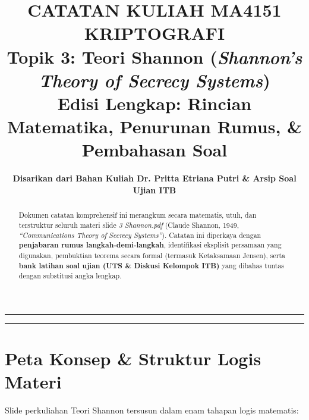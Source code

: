 \documentclass[11pt,a4paper]{article}
\title{\vspace{-1cm}\textbf{\Large CATATAN KULIAH MA4151 KRIPTOGRAFI}\\\large Topik 3: Teori Shannon (\textit{Shannon's Theory of Secrecy Systems})\\\large\textbf{Edisi Lengkap: Rincian Matematika, Penurunan Rumus, \& Pembahasan Soal}}
\author{\textbf{Disarikan dari Bahan Kuliah Dr. Pritta Etriana Putri \& Arsip Soal Ujian ITB}}
\date{}
\begin{document}
\maketitle
\vspace{-0.6cm}

\begin{abstract}
Dokumen catatan komprehensif ini merangkum secara matematis, utuh, dan terstruktur seluruh materi slide \textit{3 Shannon.pdf} (Claude Shannon, 1949, \textit{``Communications Theory of Secrecy Systems''}). Catatan ini diperkaya dengan \textbf{penjabaran rumus langkah-demi-langkah}, identifikasi eksplisit persamaan yang digunakan, pembuktian teorema secara formal (termasuk Ketaksamaan Jensen), serta \textbf{bank latihan soal ujian (UTS \& Diskusi Kelompok ITB)} yang dibahas tuntas dengan substitusi angka lengkap.
\end{abstract}

\vspace{0.2cm}
\hrule
\vspace{0.3cm}

\tableofcontents

\vspace{0.4cm}
\hrule
\vspace{0.5cm}

\section{Peta Konsep \& Struktur Logis Materi}

Slide perkuliahan Teori Shannon tersusun dalam enam tahapan logis matematis:
\end{document}
